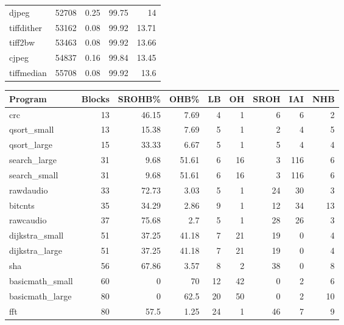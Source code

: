 \begin{tabular}{lrrrr}
 djpeg           &   52708 &   0.25 &        99.75 &   14    \\
 tiffdither      &   53162 &   0.08 &        99.92 &   13.71 \\
 tiff2bw         &   53463 &   0.08 &        99.92 &   13.66 \\
 cjpeg           &   54837 &   0.16 &        99.84 &   13.45 \\
 tiffmedian      &   55708 &   0.08 &        99.92 &   13.6  \\
\hline
\end{tabular}\begin{tabular}{lrrrrrrrr}
\hline
 Program         &   Blocks &   SROHB\% &   OHB\% &   LB &   OH &   SROH &   IAI &   NHB \\
\hline
 crc             &       13 &    46.15 &   7.69 &    4 &    1 &      6 &     6 &     2 \\
 qsort\_small     &       13 &    15.38 &   7.69 &    5 &    1 &      2 &     4 &     5 \\
 qsort\_large     &       15 &    33.33 &   6.67 &    5 &    1 &      5 &     4 &     4 \\
 search\_large    &       31 &     9.68 &  51.61 &    6 &   16 &      3 &   116 &     6 \\
 search\_small    &       31 &     9.68 &  51.61 &    6 &   16 &      3 &   116 &     6 \\
 rawdaudio       &       33 &    72.73 &   3.03 &    5 &    1 &     24 &    30 &     3 \\
 bitcnts         &       35 &    34.29 &   2.86 &    9 &    1 &     12 &    34 &    13 \\
 rawcaudio       &       37 &    75.68 &   2.7  &    5 &    1 &     28 &    26 &     3 \\
 dijkstra\_small  &       51 &    37.25 &  41.18 &    7 &   21 &     19 &     0 &     4 \\
 dijkstra\_large  &       51 &    37.25 &  41.18 &    7 &   21 &     19 &     0 &     4 \\
 sha             &       56 &    67.86 &   3.57 &    8 &    2 &     38 &     0 &     8 \\
 basicmath\_small &       60 &     0    &  70    &   12 &   42 &      0 &     2 &     6 \\
 basicmath\_large &       80 &     0    &  62.5  &   20 &   50 &      0 &     2 &    10 \\
 fft             &       80 &    57.5  &   1.25 &   24 &    1 &     46 &     7 &     9 \\

\end{tabular}
